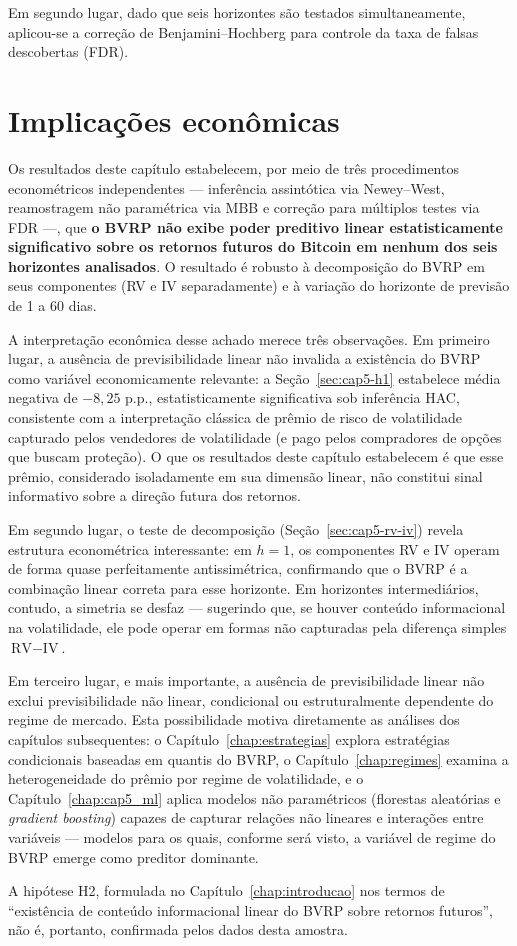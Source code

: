 Em segundo lugar, dado que seis horizontes são testados simultaneamente,
aplicou-se a correção de Benjamini--Hochberg para controle da taxa de
falsas descobertas (FDR).


\section{Implicações econômicas}
\label{sec:cap5-implicacoes}

Os resultados deste capítulo estabelecem, por meio de três procedimentos
econométricos independentes --- inferência assintótica via Newey--West,
reamostragem não paramétrica via MBB e correção para múltiplos testes via
FDR ---, que \textbf{o BVRP não exibe poder preditivo linear estatisticamente
significativo sobre os retornos futuros do Bitcoin em nenhum dos seis
horizontes analisados}. O resultado é robusto à decomposição do BVRP em seus
componentes (RV e IV separadamente) e à variação do horizonte de previsão
de 1 a 60 dias.

A interpretação econômica desse achado merece três observações. Em primeiro
lugar, a ausência de previsibilidade linear não invalida a existência do
BVRP como variável economicamente relevante: a Seção~\ref{sec:cap5-h1}
estabelece média negativa de $-8{,}25$ p.p., estatisticamente significativa
sob inferência HAC, consistente com
a interpretação clássica de prêmio de risco de volatilidade capturado pelos
vendedores de volatilidade (e pago pelos compradores de opções que buscam
proteção). O que os resultados deste capítulo estabelecem é que esse prêmio,
considerado isoladamente em sua dimensão linear, não constitui sinal
informativo sobre a direção futura dos retornos.

Em segundo lugar, o teste de decomposição (Seção~\ref{sec:cap5-rv-iv})
revela estrutura econométrica interessante: em $h=1$, os componentes RV e
IV operam de forma quase perfeitamente antissimétrica, confirmando que o
BVRP é a combinação linear correta para esse horizonte. Em horizontes
intermediários, contudo, a simetria se desfaz --- sugerindo que, se houver
conteúdo informacional na volatilidade, ele pode operar em formas não
capturadas pela diferença simples $\text{RV} - \text{IV}$.

Em terceiro lugar, e mais importante, a ausência de previsibilidade linear
não exclui previsibilidade não linear, condicional ou estruturalmente
dependente do regime de mercado. Esta possibilidade motiva diretamente as
análises dos capítulos subsequentes: o Capítulo~\ref{chap:estrategias}
explora estratégias condicionais baseadas em quantis do BVRP, o
Capítulo~\ref{chap:regimes} examina a heterogeneidade do prêmio por regime
de volatilidade, e o Capítulo~\ref{chap:cap5_ml} aplica modelos não
paramétricos (florestas aleatórias e \textit{gradient boosting}) capazes
de capturar relações não lineares e interações entre variáveis --- modelos
para os quais, conforme será visto, a variável de regime do BVRP
emerge como preditor dominante.

A hipótese H2, formulada no Capítulo~\ref{chap:introducao} nos termos de
``existência de conteúdo informacional linear do BVRP sobre retornos
futuros'', não é, portanto, confirmada pelos dados desta amostra.
